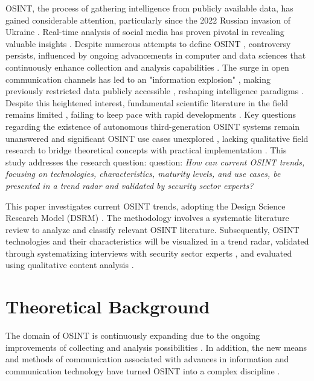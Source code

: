 \documentclass[10pt]{article}
\begin{document}
OSINT, the process of gathering intelligence from publicly available data, has gained considerable attention, particularly since
the 2022 Russian invasion of Ukraine \cite{DosPassos.2017}. Real-time analysis of social media has proven pivotal in revealing
valuable insights \cite{SmithBoyle.24.07.2023}. Despite numerous attempts to define OSINT
\cite{Hwang.2022, PastorGalindo.2020, Yogish.2021}, controversy persists, influenced by ongoing advancements in computer and
data sciences that continuously enhance collection and analysis capabilities \cite{Ghioni.2023, Williams.2018}.
The surge in open communication channels has led to an "information explosion" \cite{DosPassos.2017, Hwang.2022, Yogish.2021},
making previously restricted data publicly accessible \cite{Hwang.2022, Williams.2018}, reshaping intelligence paradigms \cite{Dokman.2020}.
Despite this heightened interest, fundamental scientific literature in the field remains limited \cite{HerreraCubides.2020},
failing to keep pace with rapid developments \cite{Ghioni.2023, Williams.2018}. Key questions regarding the existence of
autonomous third-generation OSINT systems \cite{PastorGalindo.2019, PastorGalindo.2020} remain unanswered
\cite{Ghioni.2023, PastorGalindo.2020, Yogish.2021} and significant OSINT use cases unexplored
\cite{AlKilani.2021, Dokman.2020, Ghioni.2023}, lacking qualitative field research to bridge theoretical concepts with
practical implementation \cite{HerreraCubides.2020, PastorGalindo.2019}. This study addresses the research question:
question: \textit{How can current OSINT trends, focusing on technologies, characteristics, maturity levels, and use cases,
    be presented in a trend radar and validated by security sector experts?}


This paper investigates current OSINT trends, adopting the Design Science Research Model (DSRM) \cite{Peffers.2007}.
The methodology involves a systematic literature review \cite{Webster.2002} to analyze and classify relevant OSINT literature.
Subsequently, OSINT technologies and their characteristics will be visualized in a trend radar, validated through systematizing
interviews with security sector experts \cite{Bogner.2014}, and evaluated using qualitative content analysis \cite{Billings.1997}.


\section{Theoretical Background} \label{sec:theoreticalbackground}

The domain of OSINT is continuously expanding due to the ongoing improvements of
collecting and analysis possibilities \cite{Ghioni.2023, Williams.2018}. In
addition, the new means and methods of communication associated with advances in information
and communication technology have turned OSINT into a complex discipline
\cite{Benes.2013, Williams.2018}.
\end{document}
